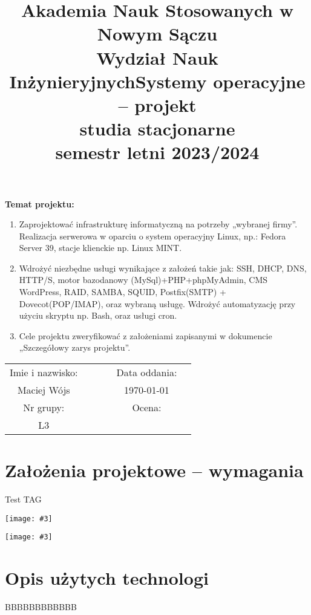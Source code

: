 \documentclass[a4paper]{article}
\title{\textbf{Akademia Nauk Stosowanych w Nowym Sączu\\Wydział Nauk Inżynieryjnych\newline \newline Systemy operacyjne – projekt\\studia stacjonarne\\semestr letni 2023/2024}}
\date{}
\newcommand*{\fg}[3][!htb]{
      \begin{figure*}[#1]
      \texttt{[image: \#3]}
      \end{figure*}
}
\begin{document}
\maketitle

\textbf{Temat projektu:}
\begin{enumerate}
    \item Zaprojektować infrastrukturę informatyczną na potrzeby „wybranej firmy”. Realizacja
          serwerowa w oparciu o system operacyjny Linux, np.: Fedora Server 39, stacje klienckie
          np. Linux MINT.
    \item Wdrożyć niezbędne usługi wynikające z założeń takie jak: SSH, DHCP, DNS, HTTP/S,
          motor bazodanowy (MySql)+PHP+phpMyAdmin, CMS WordPress, RAID, SAMBA,
          SQUID, Postfix(SMTP) + Dovecot(POP/IMAP), oraz wybraną usługę. Wdrożyć
          automatyzację przy użyciu skryptu np. Bash, oraz usługi cron.
    \item Cele projektu zweryfikować z założeniami zapisanymi w dokumencie „Szczegółowy
          zarys projektu”.
\end{enumerate}

\renewcommand{\arraystretch}{1.25}
\setlength{\tabcolsep}{12pt}

\begin{table}[h!]
    \centering
    \begin{tabular}{cccccc}
    Imie i nazwisko: &&&& Data oddania: \\
    Maciej Wójs &&&& \today \\
    Nr grupy: &&&& Ocena: \\
    L3 &  \\
    \end{tabular}
\end{table}

\newpage
\tableofcontents
\newpage

\section{Założenia projektowe – wymagania}
Test TAG
\fg{width=\textwidth}{contents/configuration/SSH/1.png}
\fg{width=\textwidth}{contents/configuration/SSH/2.png}
\section{Opis użytych technologi}
BBBBBBBBBBBB
\end{document}

